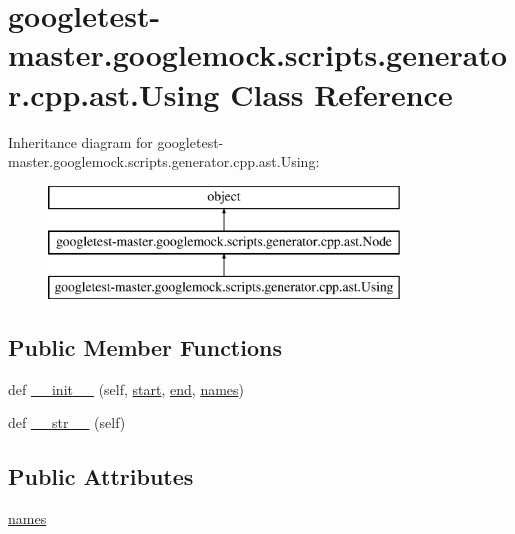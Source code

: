 \hypertarget{classgoogletest-master_1_1googlemock_1_1scripts_1_1generator_1_1cpp_1_1ast_1_1_using}{}\section{googletest-\/master.googlemock.\+scripts.\+generator.\+cpp.\+ast.\+Using Class Reference}
\label{classgoogletest-master_1_1googlemock_1_1scripts_1_1generator_1_1cpp_1_1ast_1_1_using}
Inheritance diagram for googletest-\/master.googlemock.\+scripts.\+generator.\+cpp.\+ast.\+Using\+:\begin{figure}[H]
\begin{center}
\leavevmode
\includegraphics[height=3.000000cm]{d5/da0/classgoogletest-master_1_1googlemock_1_1scripts_1_1generator_1_1cpp_1_1ast_1_1_using}
\end{center}
\end{figure}
\subsection*{Public Member Functions}
\begin{DoxyCompactItemize}
\item 
def \mbox{\hyperlink{classgoogletest-master_1_1googlemock_1_1scripts_1_1generator_1_1cpp_1_1ast_1_1_using_ac12cfb50e875a496f699209c948368ed}{\+\_\+\+\_\+init\+\_\+\+\_\+}} (self, \mbox{\hyperlink{classgoogletest-master_1_1googlemock_1_1scripts_1_1generator_1_1cpp_1_1ast_1_1_node_a6f9eb279a989f9ca27e7d0f1975336d1}{start}}, \mbox{\hyperlink{classgoogletest-master_1_1googlemock_1_1scripts_1_1generator_1_1cpp_1_1ast_1_1_node_a747e90ade89c1764e83b5b649bde18cc}{end}}, \mbox{\hyperlink{classgoogletest-master_1_1googlemock_1_1scripts_1_1generator_1_1cpp_1_1ast_1_1_using_a3f106e80f20e457134de9dd31e3dd1f1}{names}})
\item 
def \mbox{\hyperlink{classgoogletest-master_1_1googlemock_1_1scripts_1_1generator_1_1cpp_1_1ast_1_1_using_a777cbd5801cca89a0abaa49923bd3beb}{\+\_\+\+\_\+str\+\_\+\+\_\+}} (self)
\end{DoxyCompactItemize}
\subsection*{Public Attributes}
\begin{DoxyCompactItemize}
\item 
\mbox{\hyperlink{classgoogletest-master_1_1googlemock_1_1scripts_1_1generator_1_1cpp_1_1ast_1_1_using_a3f106e80f20e457134de9dd31e3dd1f1}{names}}
\end{DoxyCompactItemize}


